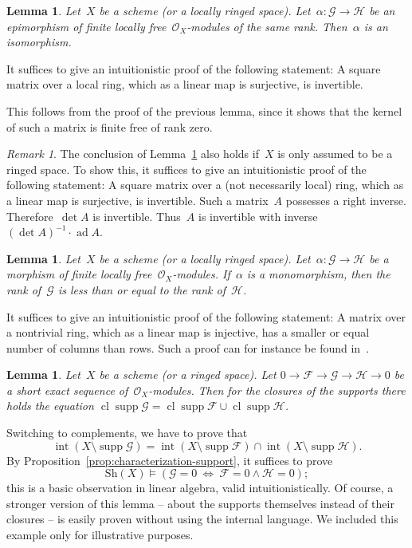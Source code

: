 \documentclass[10pt,reqno,a4paper]{amsbook}
\makeatletter
\theoremstyle{definition}
\theoremstyle{plain}
\newtheorem{lemma}[defn]{Lemma}
\theoremstyle{remark}
\newtheorem{rem}[defn]{Remark}
\newcommand{\F}{\mathcal{F}}
\newcommand{\G}{\mathcal{G}}
\renewcommand{\H}{\mathcal{H}}
\renewcommand{\O}{\mathcal{O}}
\newcommand{\Sh}{\mathrm{Sh}}
\DeclareMathOperator{\Int}{int}
\DeclareMathOperator{\Clos}{cl}
\DeclareMathOperator{\supp}{supp}
\newcommand{\?}{\,{:}\,}
\renewcommand{\_}{\mathpunct{.}\,}
\renewenvironment{proof}[1][\proofname]{\par
  \pushQED{\qed}%
  \normalfont \topsep6\p@\@plus6\p@\relax
  \trivlist
  \item[\hskip\labelsep
        \itshape
    #1\@addpunct{.}]\ignorespaces
}{%
  \popQED\endtrivlist\@endpefalse
}
\makeatother
\begin{document}
\begin{lemma}\label{lemma:epi-iso}Let~$X$ be a scheme (or a locally ringed space). Let~$\alpha : \G
\to \H$ be an epimorphism of finite locally free~$\O_X$-modules of the same
rank. Then~$\alpha$ is an isomorphism.\end{lemma}
\begin{proof}It suffices to give an intuitionistic proof of the following
statement: A square matrix over a local ring, which as a linear map is
surjective, is invertible.

This follows from the proof of the previous lemma, since it shows that the
kernel of such a matrix is finite free of rank zero.
\end{proof}

\begin{rem}The conclusion of Lemma~\ref{lemma:epi-iso} also holds if~$X$ is
only assumed to be a ringed space. To show this, it suffices to give an
intuitionistic proof of the following statement: A square matrix over a (not
necessarily local) ring, which as a linear map is surjective, is invertible.
Such a matrix~$A$ possesses a right inverse. Therefore~$\det A$ is invertible.
Thus~$A$ is invertible with inverse~$(\det A)^{-1} \cdot \operatorname{ad} A$.
\end{rem}

\begin{lemma}\label{lemma:mono-iso}Let~$X$ be a scheme (or a locally ringed space).
Let~$\alpha : \G \to \H$ be a morphism of finite locally
free~$\O_X$-modules. If~$\alpha$ is a monomorphism, then the rank of~$\G$ is
less than or equal to the rank of~$\H$.\end{lemma}

\begin{proof}It suffices to give an intuitionistic proof of the following
statement: A matrix over a nontrivial ring, which as a linear map is injective,
has a smaller or equal number of columns than rows. Such a proof can for instance be found
in~\cite[p.~1013]{richman:trivial-rings}.
\end{proof}

\begin{lemma}Let~$X$ be a scheme (or a ringed space). Let
$0 \to \F \to \G \to \H \to 0$ be a short exact sequence of~$\O_X$-modules.
Then for the closures of the supports there holds the equation
$\Clos \supp \G = \Clos \supp \F \cup \Clos \supp \H$.
\end{lemma}
\begin{proof}Switching to complements, we have to prove that
\[ \Int(X \setminus \supp\G) = \Int(X \setminus \supp\F) \cap \Int(X \setminus
\supp\H). \]
By Proposition~\ref{prop:characterization-support}, it suffices to prove
\[ \Sh(X) \models (\G = 0\ \Longleftrightarrow\ \F = 0 \wedge \H = 0); \]
this is a basic observation in linear algebra, valid intuitionistically.
\end{proof}
Of course, a stronger version of this lemma -- about the supports themselves
instead of their closures -- is easily proven without using the internal
language. We included this example only for illustrative purposes.
\end{document}
